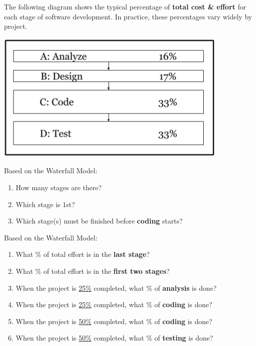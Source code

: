 

The following diagram shows the typical percentage of \textbf{total cost \& effort} for each stage of software development.
In practice, these percentages vary widely by project.

\begin{center}
\includegraphics[scale=0.75]{waterfall.png}
\end{center}

\setlength{\defaultwidth}{10em}




\Q Based on the Waterfall Model:

\begin{enumerate}%

\item How many stages are there?

\item Which stage is 1st?

\item Which stage(s) must be finished before \textbf{coding} starts?

\end{enumerate}


\Q Based on the Waterfall Model:

\begin{enumerate}%

\item What \% of total effort is in the \textbf{last stage}?

\item What \% of total effort is in the \textbf{first two stages}?

\item When the project is \underline{25\%} completed, what \% of \textbf{analysis} is done?

\item When the project is \underline{25\%} completed, what \% of \textbf{coding} is done?

\item When the project is \underline{50\%} completed, what \% of \textbf{coding} is done?

\item When the project is \underline{50\%} completed, what \% of \textbf{testing} is done?

\end{enumerate}


